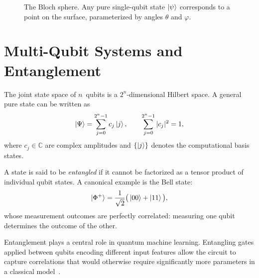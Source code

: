\begin{figure}[ht]
    \centering
    \caption{The Bloch sphere. Any pure single-qubit state $\ket{\psi}$ corresponds to a point on the surface, parameterized by angles $\theta$ and $\varphi$.}
    \label{fig:bloch_sphere}
\end{figure}
\section{Multi-Qubit Systems and Entanglement}
\label{sec:multiqubit}
The joint state space of $n$~qubits is a $2^n$-dimensional Hilbert space. A general pure state can be written as
\[
\ket{\Psi} = \sum_{j=0}^{2^n-1} c_j \ket{j},
\qquad
\sum_{j=0}^{2^n-1} |c_j|^2 = 1,
\]
where $c_j \in \mathbb{C}$ are complex amplitudes and $\{\ket{j}\}$ denotes the computational basis states.

A state is said to be \emph{entangled} if it cannot be factorized as a tensor product of individual qubit states. A canonical example is the Bell state:
\begin{equation}
    \ket{\Phi^+} = \frac{1}{\sqrt{2}} \big( \ket{00} + \ket{11} \big),
\end{equation}
whose measurement outcomes are perfectly correlated: measuring one qubit determines the outcome of the other.

Entanglement plays a central role in quantum machine learning. Entangling gates applied between qubits encoding different input features allow the circuit to capture correlations that would otherwise require significantly more parameters in a classical model~\cite{hur2022quantum}.



